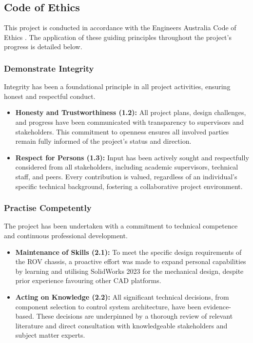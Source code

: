 \documentclass[11pt, a4paper]{article}
\begin{document}
\subsection{Code of Ethics}
\label{sec:ethics}
This project is conducted in accordance with the Engineers Australia Code of Ethics \cite{EngineersAustralia2019}. The application of these guiding principles throughout the project's progress is detailed below.

\subsubsection{Demonstrate Integrity}
Integrity has been a foundational principle in all project activities, ensuring honest and respectful conduct.
\begin{itemize}
    \item \textbf{Honesty and Trustworthiness (1.2):} All project plans, design challenges, and progress have been communicated with transparency to supervisors and stakeholders. This commitment to openness ensures all involved parties remain fully informed of the project's status and direction.
    \item \textbf{Respect for Persons (1.3):} Input has been actively sought and respectfully considered from all stakeholders, including academic supervisors, technical staff, and peers. Every contribution is valued, regardless of an individual's specific technical background, fostering a collaborative project environment.
\end{itemize}

\subsubsection{Practise Competently}
The project has been undertaken with a commitment to technical competence and continuous professional development.
\begin{itemize}
    \item \textbf{Maintenance of Skills (2.1):} To meet the specific design requirements of the ROV chassis, a proactive effort was made to expand personal capabilities by learning and utilising SolidWorks 2023 for the mechanical design, despite prior experience favouring other CAD platforms.
    \item \textbf{Acting on Knowledge (2.2):} All significant technical decisions, from component selection to control system architecture, have been evidence-based. These decisions are underpinned by a thorough review of relevant literature and direct consultation with knowledgeable stakeholders and subject matter experts.
\end{itemize}
\end{document}
